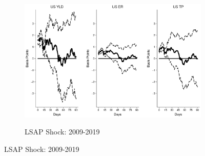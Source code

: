 \documentclass{article}
\begin{document}
\begin{figure}[tbph]
	\begin{subfigure}[t]{\textwidth}
		\begin{center}
			\includegraphics[trim={0cm 0cm 0cm 0cm},clip,height=0.26\textheight,width=1\textwidth]{../Figures/LPs/LagDep-FX/LSAP/US/DCMP/LSAPUSDnomyptp120m.eps} \\
			\caption{LSAP Shock: 2009-2019} \label{subfig:LPUS10Ylsap}
		\end{center}
	\end{subfigure}
	
\end{figure}
\end{document}
